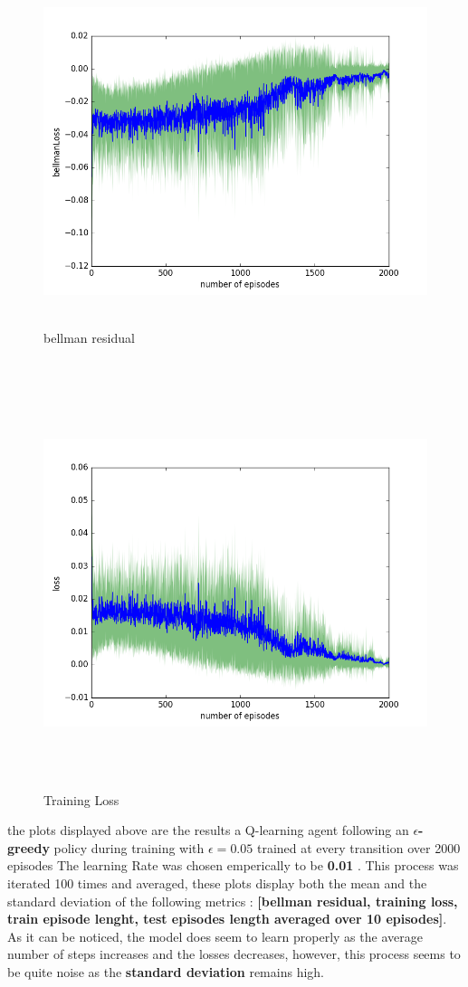 \documentclass{report}
\begin{document}
\begin{figure}[H]
    \begin{minipage}[c]{.49\linewidth}
        \centering
        \includegraphics[width = \linewidth]{plots/a4/bellmanLoss.png}
        \caption{bellman residual}
    \end{minipage}
    \hfill%
    \begin{minipage}[c]{.49\linewidth}
        \centering
        \includegraphics[width = \linewidth]{plots/a4/loss.png}
        \caption{Training Loss}
    \end{minipage}
\end{figure}


the plots displayed above are the results a Q-learning agent following an \textbf{$\epsilon$-greedy} policy during training with \textbf{$\epsilon = 0.05$} trained at every transition over 2000 episodes The learning Rate was chosen emperically to be \textbf{0.01} . This process was iterated 100 times and averaged, these plots display both the mean and the standard deviation of the following metrics : \textbf{[bellman residual, training loss, train episode lenght, test episodes length averaged over 10 episodes]}. As it can be noticed, the model does seem to learn properly as the average number of steps increases and the losses decreases, however, this process seems to be quite noise as the \textbf{standard deviation} remains high. 
\end{document}
